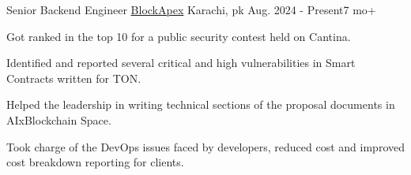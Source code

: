 

\begin{cventries}

  \cventry
  {Senior Backend Engineer} %
  {\href{https://blockapex.io/}{BlockApex}} %
  {Karachi, pk} %
  {Aug. 2024 - Present{\enskip\cdotp\enskip}7 mo+} %
  {
    \begin{cvitems} %
      \item {Got ranked in the top 10 for a public security contest held on Cantina.}
      \item {Identified and reported several critical and high vulnerabilities in Smart Contracts written for TON.}
      \item {Helped the leadership in writing technical sections of the proposal documents in AIxBlockchain Space.}
      \item {Took charge of the DevOps issues faced by developers, reduced cost and improved cost breakdown reporting for clients.}
    \end{cvitems}
  }


\end{cventries}
